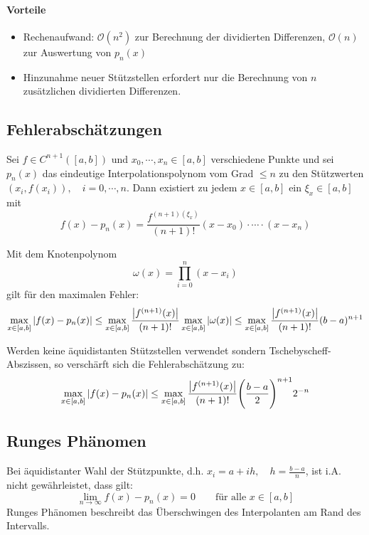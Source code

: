 		\paragraph{Vorteile}
			\begin{itemize}
				\item Rechenaufwand: \( \mathcal{O}(n^2) \) zur Berechnung der dividierten Differenzen, \( \mathcal{O}(n) \) zur Auswertung von \( p_n(x) \)
				\item Hinzunahme neuer Stützstellen erfordert nur die Berechnung von \(n\) zusätzlichen dividierten Differenzen.
			\end{itemize}

	\subsection{Fehlerabschätzungen}
		Sei \( f \in C^{n+1}([a, b]) \) und \( x_0, \cdots, x_n \in [a, b] \) verschiedene Punkte und sei \( p_n(x) \) das eindeutige Interpolationspolynom vom Grad \( \leq n \) zu den Stützwerten \( (x_i, f(x_i)), \quad i = 0, \cdots, n \). Dann existiert zu jedem \( x \in [a, b] \) ein \( \xi_x \in [a, b] \) mit
		\begin{equation*}
			f(x) - p_n(x) = \frac{f^{(n + 1)(\xi_x)}}{(n + 1)!} (x - x_0) \cdot \cdots \cdot (x - x_n)
		\end{equation*}

		Mit dem Knotenpolynom \[ \omega(x) = \prod_{i = 0}^n (x - x_i) \] gilt für den maximalen Fehler:
		\begin{equation*}
			\max_{x \in [a, b]} \abs{f(x) - p_n(x)} \leq \max_{x \in [a, b]} \frac{\abs{f^{(n + 1)}(x)}}{(n + 1)!} \max_{x \in [a, b]} \abs{\omega(x)} \leq \max_{x \in [a, b]} \frac{\abs{f^{(n + 1)}(x)}}{(n + 1)!} (b - a)^{n+1}
		\end{equation*}

		Werden keine äquidistanten Stützstellen verwendet sondern Tschebyscheff-Abszissen, so verschärft sich die Fehlerabschätzung zu:
		\begin{equation*}
			\max_{ x \in [a,b] } \abs{f(x) - p_n(x)} \leq \max_{x \in [a, b]} \frac{\abs{f^{(n+1)}(x)}}{(n + 1)!} \Bigg(\frac{b-a}{2}\Bigg)^{n+1} 2^{-n}
		\end{equation*}

	\subsection{Runges Phänomen}
		Bei äquidistanter Wahl der Stützpunkte, d.h. \( x_i = a + ih, \quad h = \frac{b - a}{n} \), ist i.A. nicht gewährleistet, dass gilt:
		\begin{equation*}
			\lim\limits_{n \rightarrow \infty} f(x) - p_n(x) = 0 \qquad \textrm{für alle } x \in [a, b]
		\end{equation*}
		Runges Phänomen beschreibt das Überschwingen des Interpolanten am Rand des Intervalls.

